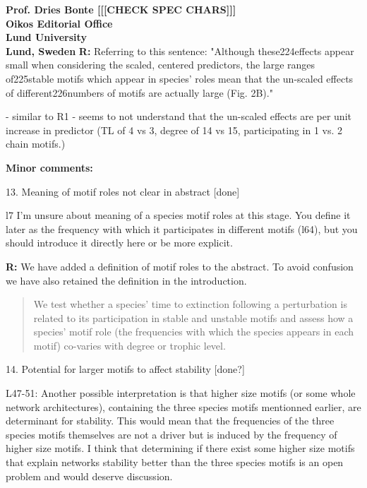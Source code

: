 \documentclass[12pt]{letter}
\begin{document}
\begin{letter}{\bf Prof. Dries Bonte [[[CHECK SPEC CHARS]]]\\
Oikos Editorial Office \\
Lund University \\
Lund, Sweden}
      \textbf{R:}
      Referring to this sentence: "Although these224effects appear small when considering the scaled, centered predictors, the large ranges of225stable motifs which appear in species’ roles mean that the un-scaled effects of different226numbers of motifs are actually large (Fig. 2B)."

      - similar to R1 - seems to not understand that the un-scaled effects are per unit increase in predictor (TL of 4 vs 3, degree of 14 vs 15, participating in 1 vs. 2 chain motifs.)


  \textbf{Minor comments:}

    13. Meaning of motif roles not clear in abstract [done]

      l7  I’m unsure about meaning of a species motif roles at this stage. You define it later as the frequency with which it participates in different motifs (l64), but you should introduce it directly here or be more explicit.

      \textbf{R:} We have added a definition of motif roles to the abstract. To avoid confusion we have also retained the definition in the introduction.

      \begin{quotation}
       We test whether a species' time to extinction following a perturbation is related to its participation in stable and unstable motifs and assess how a species' motif role (the frequencies with which the species appears in each motif) co-varies with degree or trophic level.
      \end{quotation}


    14. Potential for larger motifs to affect stability [done?]

      L47-51: Another possible interpretation is that higher size motifs (or some whole network architectures), containing the three species motifs mentionned earlier, are determinant for stability. This would mean that the frequencies of the three species motifs themselves are not a driver but is induced by the frequency of higher size motifs. I think that determining if there exist some higher size motifs that explain networks stability better than the three species motifs is an open problem and would deserve discussion.


\end{letter}
\end{document}
